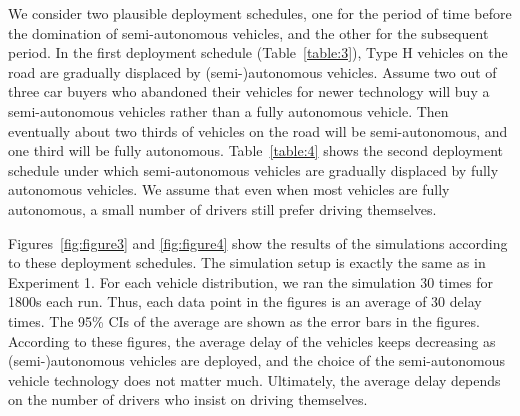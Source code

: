 



We consider two plausible deployment schedules, one for the period of
time before the domination of semi-autonomous vehicles, and the other
for the subsequent period.  In the first deployment schedule
(Table~\ref{table:3}), Type H vehicles on the road are gradually
displaced by (semi-)autonomous vehicles.  Assume two out of three car
buyers who abandoned their vehicles for newer technology will buy a
semi-autonomous vehicles rather than a fully autonomous vehicle.  Then
eventually about two thirds of vehicles on the road will be
semi-autonomous, and one third will be fully autonomous.
Table~\ref{table:4} shows the second deployment schedule under which
semi-autonomous vehicles are gradually displaced by fully autonomous
vehicles. We assume that even when most vehicles are fully autonomous,
a small number of drivers still prefer driving themselves.

Figures~\ref{fig:figure3} and \ref{fig:figure4} show the results of
the simulations according to these deployment schedules.  The
simulation setup is exactly the same as in Experiment 1.  For each
vehicle distribution, we ran the simulation 30 times for 1800s each
run.  Thus, each data point in the figures is an average of 30 delay
times.  The 95\% CIs of the average are shown as the error bars in the
figures.  According to these figures, the average delay of the
vehicles keeps decreasing as \mbox{(semi-)autonomous} vehicles are deployed,
and the choice of the semi-autonomous vehicle technology does not
matter much.  Ultimately, the average delay depends on the number of
drivers who insist on driving themselves.

